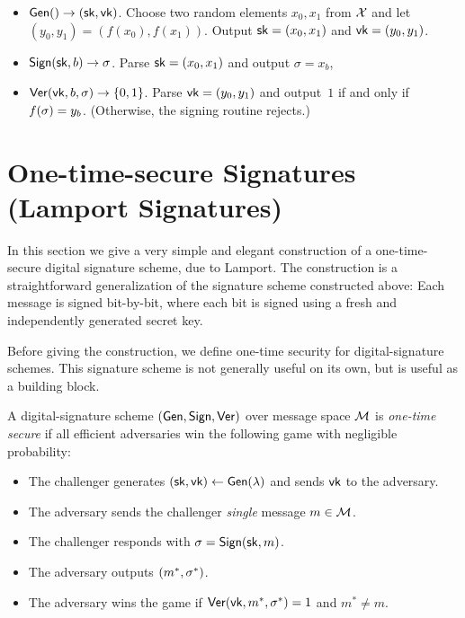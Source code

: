 \begin{itemize}
  \item $\mathsf{Gen}() \to ({\mathsf{sk}}, \mathsf{vk})$. 
    Choose two random elements $x_0, x_1$ from $\mathcal{X}$ and let $(y_0,y_1)=(f(x_0),f(x_1))$.  Output ${\mathsf{sk}}=(x_0,x_1)$ and $\mathsf{vk}=(y_0,y_1)$.
    
	\item $\mathsf{Sign}({\mathsf{sk}}, b) \to \sigma$.  Parse ${\mathsf{sk}}=(x_0,x_1)$ and output $\sigma=x_b$, 
	\item $\mathsf{Ver}(\mathsf{vk}, b, \sigma) \to \{0,1\}$. Parse $\mathsf{vk}=(y_0,y_1)$ and output~$1$ if and only if $f(\sigma)=y_b$. 
    (Otherwise, the signing routine rejects.)
\end{itemize}


\section{One-time-secure Signatures (Lamport Signatures)} \label{sec:lamport}

In this section we give a very simple and elegant construction 
of a one-time-secure digital signature scheme, due to Lamport.\autocite{L79}
The construction is a straightforward generalization of  the signature scheme constructed above:  Each message is signed bit-by-bit, where each bit is signed using a fresh and independently generated secret key. 


Before giving the construction, we define one-time security for 
digital-signature schemes.
This signature scheme is not generally useful on its own, but is
useful as a building block.

\begin{definition}\label{def:sig-once}
A digital-signature scheme $(\mathsf{Gen}, \mathsf{Sign}, \mathsf{Ver})$ over message space $\mathcal{M}$ is \emph{one-time secure} if all efficient adversaries win
the following game with negligible probability:
  \begin{itemize}[noitemsep]
    \item The challenger generates $({\mathsf{sk}}, \mathsf{vk}) \leftarrow \mathsf{Gen}(\lambda)$ and sends $\mathsf{vk}$ to the adversary.
    \item The adversary sends the challenger \emph{single} message $m \in \mathcal{M}$.
    \item The challenger responds with $\sigma = \mathsf{Sign}({\mathsf{sk}}, m)$.
    \item The adversary outputs $(m^*, \sigma^*)$.
    \item The adversary wins the game if $\mathsf{Ver}(\mathsf{vk}, m^*, \sigma^*) = 1$ and $m^* \neq m$.
\end{itemize}
\end{definition}

